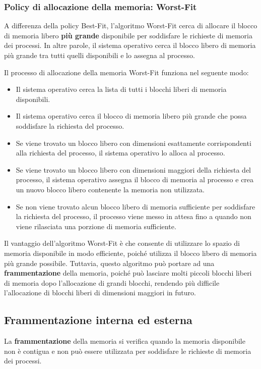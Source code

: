 \documentclass{article}
\begin{document}
\subsubsection{Policy di allocazione della memoria: Worst-Fit}

A differenza della policy Best-Fit, l'algoritmo Worst-Fit cerca di allocare il blocco di memoria libero \textbf{più grande} disponibile per soddisfare le richieste di memoria dei processi. In altre parole, il sistema operativo cerca il blocco libero di memoria più grande tra tutti quelli disponibili e lo assegna al processo.

Il processo di allocazione della memoria Worst-Fit funziona nel seguente modo:
\begin{itemize}
    \item Il sistema operativo cerca la lista di tutti i blocchi liberi di memoria disponibili.
    \item Il sistema operativo cerca il blocco di memoria libero più grande che possa soddisfare la richiesta del processo.
    \item Se viene trovato un blocco libero con dimensioni esattamente corrispondenti alla richiesta del processo, il sistema operativo lo alloca al processo.
    \item Se viene trovato un blocco libero con dimensioni maggiori della richiesta del processo, il sistema operativo assegna il blocco di memoria al processo e crea un nuovo blocco libero contenente la memoria non utilizzata.
    \item Se non viene trovato alcun blocco libero di memoria sufficiente per soddisfare la richiesta del processo, il processo viene messo in attesa fino a quando non viene rilasciata una porzione di memoria sufficiente.
\end{itemize}
Il vantaggio dell'algoritmo Worst-Fit è che consente di utilizzare lo spazio di memoria disponibile in modo efficiente, poiché utilizza il blocco libero di memoria più grande possibile. Tuttavia, questo algoritmo può portare ad una \textbf{frammentazione} della memoria, poiché può lasciare molti piccoli blocchi liberi di memoria dopo l'allocazione di grandi blocchi, rendendo più difficile l'allocazione di blocchi liberi di dimensioni maggiori in futuro.

\subsection{Frammentazione interna ed esterna}


La \textbf{frammentazione} della memoria si verifica quando la memoria disponibile non è contigua e non può essere utilizzata per soddisfare le richieste di memoria dei processi.
\end{document}

